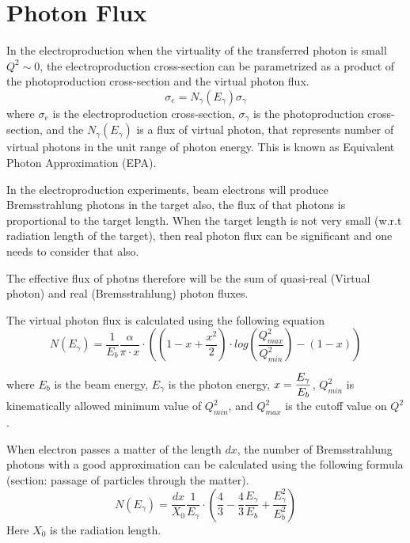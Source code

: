 \documentclass[letterpaper,12pt]{article}
\def\dfrac#1#2{\displaystyle{{#1}\over{#2}}}
\begin{document}
 \section{ Photon Flux }
 In the electroproduction when the virtuality of the transferred photon is small $Q^{2} \sim 0$,  
 the electroproduction cross-section can be parametrized as a product of the photoproduction cross-section and the
 virtual photon flux.
 \begin{equation}
  \sigma_{e} = N_{\gamma}(E_{\gamma})\sigma_{\gamma}
 \end{equation}
 where $\sigma_{e}$ is the electroproduction cross-section, $\sigma_{\gamma}$ is
 the photoproduction cross-section, and the $N_{\gamma}(E_{\gamma})$ is a flux of virtual photon, that represents
 number of virtual photons in the unit range of photon energy. This is known as
 Equivalent Photon Approximation (EPA).
 
 In the electroproduction experiments, beam electrons will produce Bremsstrahlung photons in the target also,
 the flux of that photons is proportional to the target length.
 When the target length is not very small (w.r.t radiation  length of the target), then real photon flux
 can be significant and one needs to consider that also.
 
 The effective flux of photns therefore will be the sum of quasi-real (Virtual photon) and real
 (Bremsstrahlung) photon fluxes.
 
 The virtual photon flux is calculated using the following
 equation \cite{Phot_Flux1}
 \begin{equation}
  N(E_{\gamma}) = \frac{1}{E_{b}} \frac{\alpha}{\pi\cdot x}
  \cdot\left( (1 - x + \frac{x^{2}}{2})\cdot log(\frac{Q^{2}_{max}}{Q^{2}_{min}}) - (1 - x)\right)
 \end{equation}

where $E_{b}$ is the beam energy, $E_{\gamma}$ is the photon energy, $x = \dfrac{E_{\gamma}}{E_{b}}$, 
$Q^{2}_{min}$ is kinematically allowed minimum value of $Q^{2}_{min}$, and $Q^{2}_{max}$ is the
cutoff value on $Q^{2}$. 
 
 When electron passes a matter of the length $dx$, the number of Bremsstrahlung photons
 with a good approximation can be calculated using the following formula \cite{PDG} (section: passage of
 particles through the matter).
 \begin{equation}
  N(E_{\gamma}) = \frac{dx}{X_{0}}\frac{1}{E_{\gamma}}\cdot\left( \frac{4}{3} - \frac{4}{3}\frac{E_{\gamma}}{E_{b}} 
   + \frac{E_{\gamma}^{2}}{E_{b}^{2}}\right)
   \label{eq:Bremsstr}
 \end{equation}
Here $X_{0}$ is the radiation length.
\end{document}
